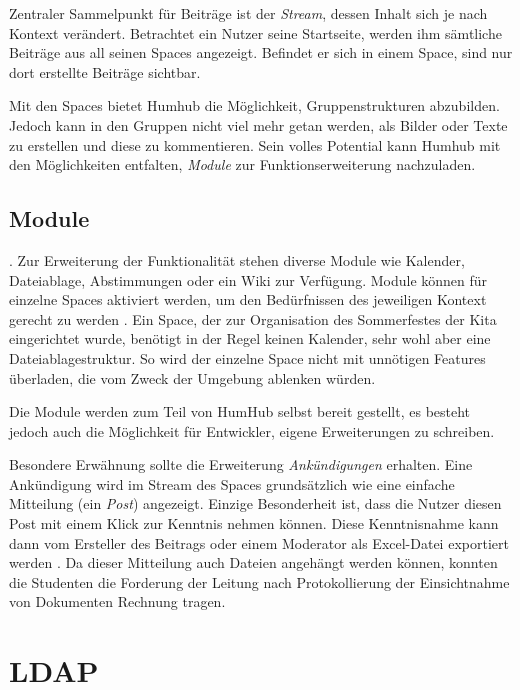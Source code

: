 Zentraler Sammelpunkt für Beiträge ist der \textit{Stream}, dessen Inhalt sich je nach Kontext verändert. Betrachtet ein Nutzer seine Startseite, werden ihm sämtliche Beiträge aus all seinen Spaces angezeigt. Befindet er sich in einem Space, sind nur dort erstellte Beiträge sichtbar.

Mit den Spaces bietet Humhub die Möglichkeit, Gruppenstrukturen abzubilden. Jedoch kann in den Gruppen nicht viel mehr getan werden, als Bilder oder Texte zu erstellen und diese zu kommentieren.
Sein volles Potential kann Humhub mit den Möglichkeiten entfalten, \textit{Module} zur Funktionserweiterung nachzuladen.

\subsection{Module}

 \citep[][]{modules}. Zur Erweiterung der Funktionalität stehen diverse Module wie Kalender, Dateiablage, Abstimmungen oder ein Wiki zur Verfügung.
Module können für einzelne Spaces aktiviert werden, um den Bedürfnissen des jeweiligen Kontext gerecht zu werden \citep[vgl.][ff.]{modules}. Ein Space, der zur Organisation des Sommerfestes der Kita eingerichtet wurde, benötigt \zb in der Regel keinen Kalender, sehr wohl aber eine Dateiablagestruktur.
So wird der einzelne Space nicht mit unnötigen Features überladen, die vom Zweck der Umgebung ablenken würden. 

Die Module werden zum Teil von HumHub selbst bereit gestellt, es besteht jedoch auch die Möglichkeit für Entwickler, eigene Erweiterungen zu schreiben.

Besondere Erwähnung sollte die Erweiterung \textit{Ankündigungen} erhalten. 
Eine Ankündigung wird im Stream des Spaces grundsätzlich wie eine einfache Mitteilung (ein \textit{Post}) angezeigt. Einzige Besonderheit ist, dass die Nutzer diesen Post mit einem Klick zur Kenntnis nehmen können. Diese Kenntnisnahme kann dann vom Ersteller des Beitrags oder einem Moderator \zb als Excel-Datei exportiert werden  \citep[Quellcode unter][]{announcement}. Da dieser Mitteilung auch Dateien angehängt werden können, konnten die Studenten die Forderung der Leitung nach Protokollierung der Einsichtnahme von Dokumenten Rechnung tragen.


\section{LDAP}

